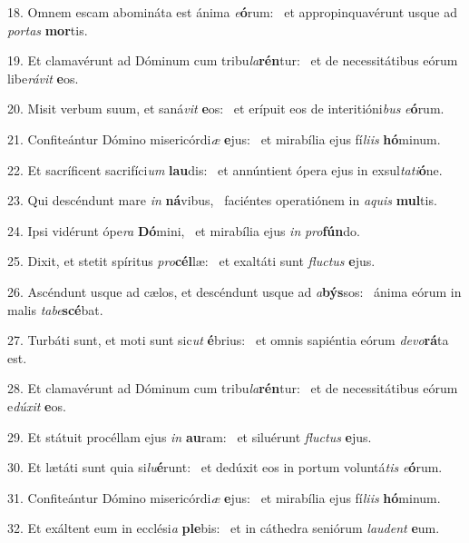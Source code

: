 18. Omnem escam abomináta est ánima \textit{e}\textbf{ó}rum: \ast\  et appropinquavérunt usque ad \textit{por}\textit{tas} \textbf{mor}tis.\

19. Et clamavérunt ad Dóminum cum tribu\textit{la}\textbf{rén}tur: \ast\  et de necessitátibus eórum libe\textit{rá}\textit{vit} \textbf{e}os.\

20. Misit verbum suum, et saná\textit{vit} \textbf{e}os: \ast\  et erípuit eos de interitióni\textit{bus} \textit{e}\textbf{ó}rum.\

21. Confiteántur Dómino misericórdi\textit{æ} \textbf{e}jus: \ast\  et mirabília ejus fí\textit{li}\textit{is} \textbf{hó}minum.\

22. Et sacríficent sacrifíci\textit{um} \textbf{lau}dis: \ast\  et annúntient ópera ejus in exsul\textit{ta}\textit{ti}\textbf{ó}ne.\

23. Qui descéndunt mare \textit{in} \textbf{ná}vibus, \ast\  faciéntes operatiónem in \textit{a}\textit{quis} \textbf{mul}tis.\

24. Ipsi vidérunt ópe\textit{ra} \textbf{Dó}mini, \ast\  et mirabília ejus \textit{in} \textit{pro}\textbf{fún}do.\

25. Dixit, et stetit spíritus \textit{pro}\textbf{cél}læ: \ast\  et exaltáti sunt \textit{fluc}\textit{tus} \textbf{e}jus.\

26. Ascéndunt usque ad cælos, et descéndunt usque ad \textit{a}\textbf{býs}sos: \ast\  ánima eórum in malis \textit{ta}\textit{be}\textbf{scé}bat.\

27. Turbáti sunt, et moti sunt sic\textit{ut} \textbf{é}brius: \ast\  et omnis sapiéntia eórum \textit{de}\textit{vo}\textbf{rá}ta est.\

28. Et clamavérunt ad Dóminum cum tribu\textit{la}\textbf{rén}tur: \ast\  et de necessitátibus eórum e\textit{dú}\textit{xit} \textbf{e}os.\

29. Et státuit procéllam ejus \textit{in} \textbf{au}ram: \ast\  et siluérunt \textit{fluc}\textit{tus} \textbf{e}jus.\

30. Et lætáti sunt quia si\textit{lu}\textbf{é}runt: \ast\  et dedúxit eos in portum voluntá\textit{tis} \textit{e}\textbf{ó}rum.\

31. Confiteántur Dómino misericórdi\textit{æ} \textbf{e}jus: \ast\  et mirabília ejus fí\textit{li}\textit{is} \textbf{hó}minum.\

32. Et exáltent eum in ecclési\textit{a} \textbf{ple}bis: \ast\  et in cáthedra seniórum \textit{lau}\textit{dent} \textbf{e}um.\

